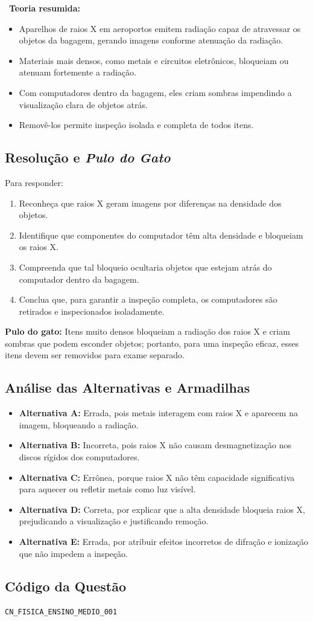 \documentclass{article}
\begin{document}
\
\textbf{Teoria resumida:}

\begin{itemize}
\item Aparelhos de raios X em aeroportos emitem radiação capaz de atravessar os objetos da bagagem, gerando imagens conforme atenuação da radiação.
\item Materiais mais densos, como metais e circuitos eletrônicos, bloqueiam ou atenuam fortemente a radiação.
\item Com computadores dentro da bagagem, eles criam sombras impendindo a visualização clara de objetos atrás.
\item Removê-los permite inspeção isolada e completa de todos itens.
\end{itemize}

\subsection*{Resolução e \textit{Pulo do Gato}}

Para responder:
\begin{enumerate}
\item Reconheça que raios X geram imagens por diferenças na densidade dos objetos.
\item Identifique que componentes do computador têm alta densidade e bloqueiam os raios X.
\item Compreenda que tal bloqueio ocultaria objetos que estejam atrás do computador dentro da bagagem.
\item Conclua que, para garantir a inspeção completa, os computadores são retirados e inspecionados isoladamente.
\end{enumerate}

\textbf{Pulo do gato:} Itens muito densos bloqueiam a radiação dos raios X e criam sombras que podem esconder objetos; portanto, para uma inspeção eficaz, esses itens devem ser removidos para exame separado.

\subsection*{Análise das Alternativas e Armadilhas}

\begin{itemize}
\item \textbf{Alternativa A:} Errada, pois metais interagem com raios X e aparecem na imagem, bloqueando a radiação.
\item \textbf{Alternativa B:} Incorreta, pois raios X não causam desmagnetização nos discos rígidos dos computadores.
\item \textbf{Alternativa C:} Errônea, porque raios X não têm capacidade significativa para aquecer ou refletir metais como luz visível.
\item \textbf{Alternativa D:} Correta, por explicar que a alta densidade bloqueia raios X, prejudicando a visualização e justificando remoção.
\item \textbf{Alternativa E:} Errada, por atribuir efeitos incorretos de difração e ionização que não impedem a inspeção.
\end{itemize}

\subsection*{Código da Questão}

\texttt{CN\_FISICA\_ENSINO\_MEDIO\_001}
\end{document}
